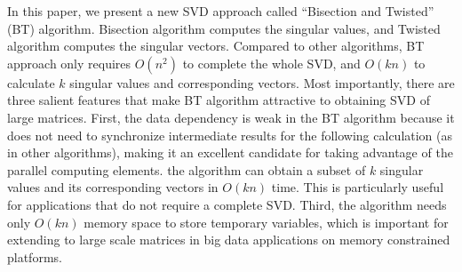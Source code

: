
In this paper, we present a new SVD approach called ``Bisection and Twisted'' (BT) algorithm. 
Bisection algorithm \cite{95ETNAbisecion} computes the singular values, and Twisted algorithm \cite{09NLAAtwisted} computes the singular vectors. %
Compared to other algorithms, BT approach only requires $O(n^2)$ to complete the whole SVD\cite{09NLAAtwisted,05UCB}, and $O(kn)$ to calculate $k$ singular values and corresponding vectors.
Most importantly, there are three salient features that make BT algorithm attractive
to obtaining SVD of large matrices. 
First, the data dependency is weak in the BT algorithm because it does not need to synchronize intermediate results for the following calculation (as in other algorithms), making it an excellent candidate for taking advantage of the parallel computing
elements. %
the algorithm can obtain a subset of $k$ singular values and its corresponding vectors in $O(kn)$ time. This is particularly useful for applications that
do not require a complete SVD.
Third, the algorithm needs only $O(kn)$ memory space to store
temporary variables, which is important for extending to large scale
matrices in big data applications on memory constrained platforms.


